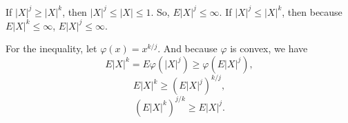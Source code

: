 \documentclass[en, normal, 11pt, black]{elegantnote}
\renewenvironment{proof}{\begin{tcolorbox}[colback=white, colframe=black!50, breakable, title=Proof. ]\setlength{\parskip}{0.8em}}{\,\\\rightline{$\square$}\end{tcolorbox}}
\begin{document}
    \begin{proof}
        If $|X|^j\geqslant|X|^k$, then $|X|^j\leqslant|X|\leqslant1$. So, $E|X|^j\leqslant\infty$. If $|X|^j\leqslant|X|^k$, then because $E|X|^k\leqslant\infty$, $E|X|^j\leqslant\infty$. 
        
        For the inequality, let $\varphi(x)=x^{k/j}$. And because $\varphi$ is convex, we have
        \[
            E|X|^{k}=E\varphi\left(|X|^j\right)\geqslant\varphi\left(E|X|^j\right), 
        \]
        \[
            E|X|^{k}\geqslant\left(E|X|^j\right)^{k/j}, 
        \]
        \[
            \left(E|X|^{k}\right)^{j/k}\geqslant E|X|^j. 
        \]
        \vspace{-30pt}
    \end{proof}
\end{document}
